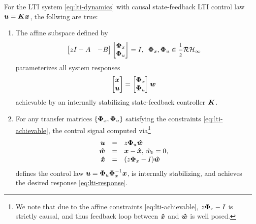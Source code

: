 \begin{theorem}\label{thm:lti-sls}
For the LTI system \eqref{eq:lti-dynamics} with causal state-feedback LTI control law $\boldsymbol{u} = \boldsymbol{K} \boldsymbol{x}$, the follwing are true:
\begin{enumerate}
\item The affine subspace defined by 
\begin{equation}
\begin{bmatrix} zI - A & - B \end{bmatrix} \begin{bmatrix} \boldsymbol{\Phi}_x \\ \boldsymbol{\Phi}_u \end{bmatrix} = I, \, \ \boldsymbol{\Phi}_x, \boldsymbol{\Phi}_u \in \frac{1}{z}\mathcal{RH}_\infty
\label{eq:lti-achievable}
\end{equation}
parameterizes all system responses
\begin{equation}
\begin{bmatrix} \boldsymbol{x} \\ \boldsymbol{u} \end{bmatrix} = \begin{bmatrix} \boldsymbol{\Phi}_x \\ \boldsymbol{\Phi}_u \end{bmatrix} \boldsymbol{w}
\label{eq:lti-response}
\end{equation}
achievable by an internally stabilizing state-feedback controller $\boldsymbol{K}$.
\item For any transfer matrices $\left\{\boldsymbol{\Phi}_x, \boldsymbol{\Phi}_u\right\}$ satisfying the constraints \eqref{eq:lti-achievable}, the control signal computed via\footnote{We note that due to the affine constraints \eqref{eq:lti-achievable}, $z\boldsymbol{\Phi}_x-I$ is strictly causal, and thus feedback loop between $\boldsymbol{\hat x}$ and $\boldsymbol{\hat w}$ is well posed.}
\begin{equation}
\begin{array}{rcl}
\boldsymbol{u} &=& z\boldsymbol{\Phi}_u \boldsymbol{\hat w} \\
\boldsymbol{\hat w} &=& \boldsymbol{x} - \boldsymbol{\hat x}, \, \hat{w}_0 = 0, \\ 
\boldsymbol{\hat x} &=& (z\boldsymbol{\Phi}_x - I)\boldsymbol{\hat w}
\end{array}
\label{eq:lti-realization}
\end{equation}
defines the control law $\boldsymbol{u} = \boldsymbol{\Phi}_u\boldsymbol{\Phi}_x^{-1}\boldsymbol{x}$, is internally stabilizing, and achieves the desired response \eqref{eq:lti-response}.
\end{enumerate}
\end{theorem}

